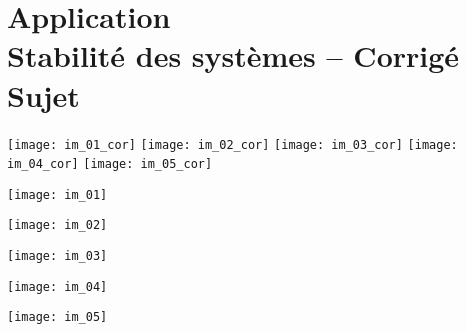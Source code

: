 \chapter*{Application  \\ 
Stabilité des systèmes -- \ifprof Corrigé \else Sujet \fi}

\iflivret {} \else
\ifprof  {} \else \fi
\fi

\setcounter{question}{0}


 
\ifprof

\begin{center}
\texttt{[image: im\_01\_cor]}
\texttt{[image: im\_02\_cor]}
\texttt{[image: im\_03\_cor]}
\texttt{[image: im\_04\_cor]}
\texttt{[image: im\_05\_cor]}
\end{center}

\else
\begin{minipage}[c]{.48\linewidth}
\begin{center}
\texttt{[image: im\_01]}
\end{center}
\end{minipage}
\begin{minipage}[c]{.48\linewidth}
\begin{center}
\texttt{[image: im\_02]}
\end{center}
\end{minipage}


\begin{minipage}[c]{.48\linewidth}
\begin{center}
\texttt{[image: im\_03]}
\end{center}
\end{minipage}
\begin{minipage}[c]{.48\linewidth}
\begin{center}
\texttt{[image: im\_04]}
\end{center}
\end{minipage}


\begin{center}
\texttt{[image: im\_05]}
\end{center}
\fi




